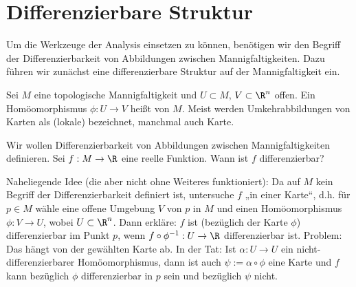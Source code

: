 
%

\section{Differenzierbare Struktur}

Um die Werkzeuge der Analysis einsetzen zu können, benötigen wir den Begriff der Differenzierbarkeit von Abbildungen zwischen Mannigfaltigkeiten.
Dazu führen wir zunächst eine differenzierbare Struktur auf der Mannigfaltigkeit ein.

\begin{df} \label{1.5}
    Sei $M$ eine topologische Mannigfaltigkeit und $U \subset M$, $V \subset \R^n$ offen.
    Ein Homöomorphismus $\phi: U \to V$ heißt  von $M$.
    Meist werden Umkehrabbildungen von Karten als (lokale)  bezeichnet, manchmal auch Karte.
\end{df}

Wir wollen Differenzierbarkeit von Abbildungen zwischen Mannigfaltigkeiten definieren.
Sei $f: M \to \R$ eine reelle Funktion.
Wann ist $f$ differenzierbar?

Naheliegende Idee (die aber nicht ohne Weiteres funktioniert):
Da auf $M$ kein Begriff der Differenzierbarkeit definiert ist, untersuche $f$ „in einer Karte“, d.h. für $p \in M$ wähle eine offene Umgebung $V$ von $p$ in $M$ und einen Homöomorphismus $\phi: V \to U$, wobei $U \subset \R^n$.
Dann erkläre: $f$ ist (bezüglich der Karte $\phi$) differenzierbar im Punkt $p$, wenn
\begin{math}
    f \circ \phi^{-1}: U \to \R
\end{math}
differenzierbar ist.
Problem: Das hängt von der gewählten Karte ab.
In der Tat: Ist $\alpha: U \to U$ ein nicht-differenzierbarer Homöomorphismus, dann ist auch $\psi := \alpha \circ \phi$ eine Karte und $f$ kann bezüglich $\phi$ differenzierbar in $p$ sein und bezüglich $\psi$ nicht.

